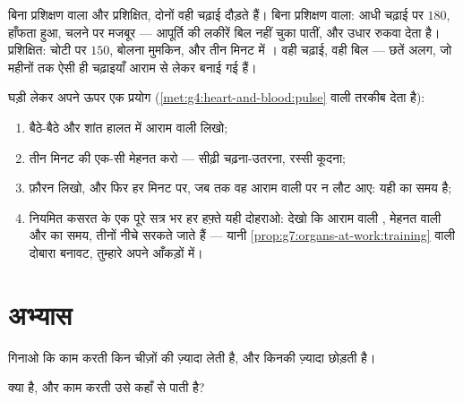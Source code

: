 \begin{example}[दो दौड़ने वाले, एक ही चढ़ाई]\label{ex:g7:organs-at-work:runners}
बिना प्रशिक्षण वाला और प्रशिक्षित, दोनों वही चढ़ाई दौड़ते हैं। बिना
प्रशिक्षण वाला: आधी चढ़ाई पर  $180$, हाँफता हुआ, चलने पर मजबूर ---
आपूर्ति की लकीरें बिल नहीं चुका पातीं, और उधार रुकवा देता है।
प्रशिक्षित: चोटी पर  $150$, बोलना मुमकिन, और तीन मिनट में ।
वही चढ़ाई, वही बिल --- छतें अलग, जो महीनों तक ऐसी ही चढ़ाइयाँ आराम से
लेकर बनाई गई हैं।
\end{example}

\begin{method}[अपनी ही मशीन पढ़ना]\label{met:g7:organs-at-work:read}
घड़ी लेकर अपने ऊपर एक प्रयोग
(\cref{met:g4:heart-and-blood:pulse}  वाली तरकीब देता है):
\begin{enumerate}
  \item बैठे-बैठे और शांत हालत में आराम वाली  लिखो;
  \item तीन मिनट की एक-सी मेहनत करो --- सीढ़ी चढ़ना-उतरना, रस्सी कूदना;
  \item फ़ौरन  लिखो, और फिर हर मिनट पर, जब तक वह आराम वाली पर न
        लौट आए: यही  का समय है;
  \item नियमित कसरत के एक पूरे सत्र भर हर हफ़्ते यही दोहराओ: देखो कि
        आराम वाली , मेहनत वाली  और  का समय, तीनों नीचे
        सरकते जाते हैं --- यानी
        \cref{prop:g7:organs-at-work:training} वाली दोबारा बनावट,
        तुम्हारे अपने आँकड़ों में।
\end{enumerate}
\end{method}

\section{अभ्यास}

\begin{exercise}[$\star$]\label{exo:g7:organs-at-work:1}
गिनाओ कि काम करती  किन चीज़ों की ज़्यादा लेती है, और किनकी ज़्यादा
छोड़ती है।
\end{exercise}

\begin{exercise}[$\star$]\label{exo:g7:organs-at-work:2}
 क्या है, और काम करती  उसे कहाँ से पाती है?
\end{exercise}

